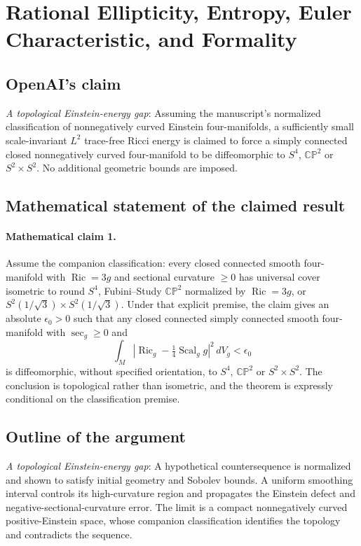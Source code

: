 \documentclass[11pt]{article}
\begin{document}
\section*{Rational Ellipticity, Entropy, Euler Characteristic, and Formality}

\subsection{OpenAI's claim}
\textit{A topological Einstein-energy gap}: Assuming the manuscript's normalized classification of nonnegatively curved Einstein four-manifolds, a sufficiently small scale-invariant $L^2$ trace-free Ricci energy is claimed to force a simply connected closed nonnegatively curved four-manifold to be diffeomorphic to $S^4$, $\mathbb{CP}^2$ or $S^2\times S^2$. No additional geometric bounds are imposed.

\subsection{Mathematical statement of the claimed result}
\paragraph{Mathematical claim 1.} Assume the companion classification: every closed connected smooth four-manifold with $\operatorname{Ric}=3g$ and sectional curvature $\ge0$ has universal cover isometric to round $S^4$, Fubini--Study $\mathbb{CP}^2$ normalized by $\operatorname{Ric}=3g$, or $S^2(1/\sqrt3)\times S^2(1/\sqrt3)$. Under that explicit premise, the claim gives an absolute $\epsilon_0>0$ such that any closed connected simply connected smooth four-manifold with $\sec_g\ge0$ and \[\int_M\left|\operatorname{Ric}_g-\tfrac14\operatorname{Scal}_g g\right|^2\,dV_g<\epsilon_0\] is diffeomorphic, without specified orientation, to $S^4$, $\mathbb{CP}^2$ or $S^2\times S^2$. The conclusion is topological rather than isometric, and the theorem is expressly conditional on the classification premise.

\subsection{Outline of the argument}
\textit{A topological Einstein-energy gap}: A hypothetical countersequence is normalized and shown to satisfy initial geometry and Sobolev bounds. A uniform smoothing interval controls its high-curvature region and propagates the Einstein defect and negative-sectional-curvature error. The limit is a compact nonnegatively curved positive-Einstein space, whose companion classification identifies the topology and contradicts the sequence.
\end{document}
